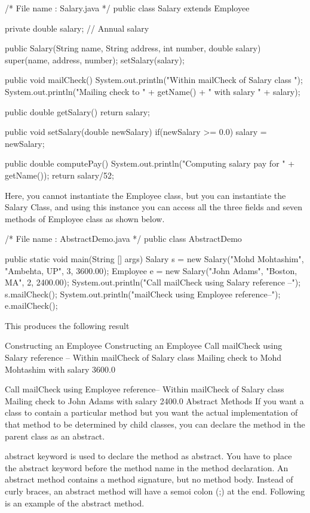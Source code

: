 /* File name : Salary.java */
public class Salary extends Employee {
   private double salary;   // Annual salary

   public Salary(String name, String address, int number, double salary) {
      super(name, address, number);
      setSalary(salary);
   }

   public void mailCheck() {
      System.out.println("Within mailCheck of Salary class ");
      System.out.println("Mailing check to " + getName() + " with salary " + salary);
   }

   public double getSalary() {
      return salary;
   }

   public void setSalary(double newSalary) {
      if(newSalary >= 0.0) {
         salary = newSalary;
      }
   }

   public double computePay() {
      System.out.println("Computing salary pay for " + getName());
      return salary/52;
   }
}
Here, you cannot instantiate the Employee class, but you can instantiate the Salary Class, and using this instance you can access all the three fields and seven methods of Employee class as shown below.

/* File name : AbstractDemo.java */
public class AbstractDemo {

   public static void main(String [] args) {
      Salary s = new Salary("Mohd Mohtashim", "Ambehta, UP", 3, 3600.00);
      Employee e = new Salary("John Adams", "Boston, MA", 2, 2400.00);
      System.out.println("Call mailCheck using Salary reference --");
      s.mailCheck();
      System.out.println("\nCall mailCheck using Employee reference--");
      e.mailCheck();
   }
}
This produces the following result

Constructing an Employee
Constructing an Employee
Call mailCheck using Salary reference --
Within mailCheck of Salary class
Mailing check to Mohd Mohtashim with salary 3600.0

Call mailCheck using Employee reference--
Within mailCheck of Salary class
Mailing check to John Adams with salary 2400.0
Abstract Methods
If you want a class to contain a particular method but you want the actual implementation of that method to be determined by child classes, you can declare the method in the parent class as an abstract.

abstract keyword is used to declare the method as abstract.
You have to place the abstract keyword before the method name in the method declaration.
An abstract method contains a method signature, but no method body.
Instead of curly braces, an abstract method will have a semoi colon (;) at the end.
Following is an example of the abstract method.

